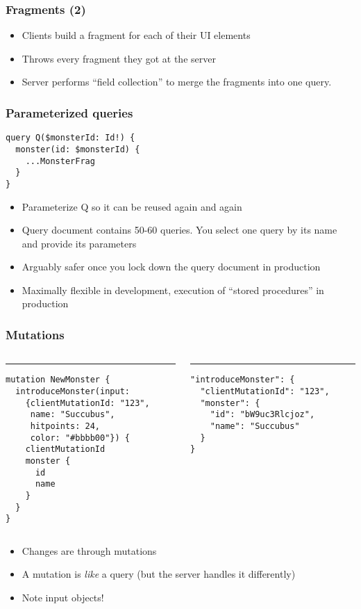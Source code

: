 \documentclass[lualatex]{beamer}
\begin{document}
\begin{frame}
  \frametitle{Fragments (2)}
  \begin{itemize}
  \item Clients build a fragment for each of their UI elements
  \item Throws every fragment they got at the server
  \item Server performs ``field collection'' to merge the fragments
    into one query.
  \end{itemize}
\end{frame}
\begin{frame}[fragile]
  \frametitle{Parameterized queries}
\begin{verbatim}
query Q($monsterId: Id!) {
  monster(id: $monsterId) {
    ...MonsterFrag
  }
}
\end{verbatim}
\begin{itemize}
\item Parameterize Q so it can be reused again and again
\item Query document contains 50-60 queries. You select one query by
  its name and provide its parameters
\item Arguably safer once you lock down the query document in
  production
\item Maximally flexible in development, execution of ``stored
  procedures'' in production
\end{itemize}
\end{frame}

\begin{frame}[fragile]
  \frametitle{Mutations}
\begin{columns}[T] %
\begin{column}{.5\textwidth}
\color{black}\rule{\linewidth}{1pt}
\begin{verbatim}
mutation NewMonster {
  introduceMonster(input:
    {clientMutationId: "123",
     name: "Succubus",
     hitpoints: 24,
     color: "#bbbb00"}) {
    clientMutationId
    monster {
      id
      name
    }
  }
}
\end{verbatim}
\end{column}
\hfill
\begin{column}{.5\textwidth}
\color{gray}\rule{\linewidth}{1pt}
\begin{verbatim}
"introduceMonster": {
  "clientMutationId": "123",
  "monster": {
    "id": "bW9uc3Rlcjoz",
    "name": "Succubus"
  }
}
\end{verbatim}
\end{column}
\end{columns}
\begin{itemize}
\item Changes are through mutations
\item A mutation is \emph{like} a query (but the server handles it differently)
\item Note input objects!
\end{itemize}
\end{frame}
\end{document}
